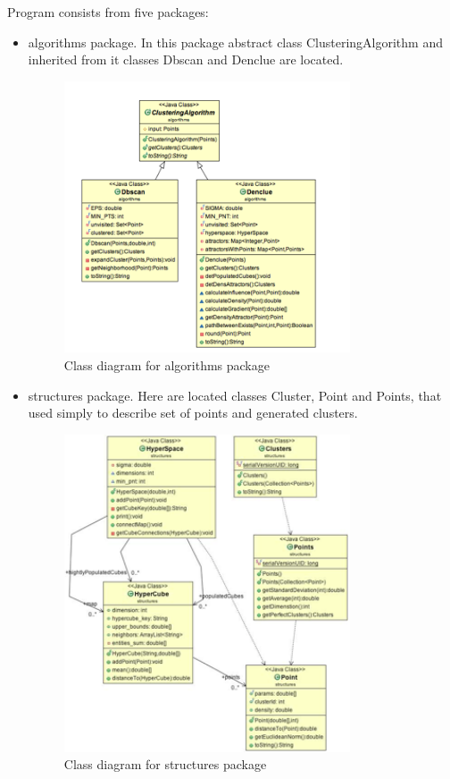 \documentclass[12pt, a4paper, notitlepage, oneside]{article}
\begin{document}
Program consists from five packages:
\begin{itemize}
	\item algorithms package. In this package abstract class ClusteringAlgorithm and inherited from it classes Dbscan and Denclue are located. 

	\begin{figure}[!ht]
 	\centering
	\includegraphics[width=0.8\textwidth]{images/algorithms_package.png}
 	\caption[]
	{Class diagram for algorithms package}
	\end{figure}


	\item structures package. Here are located classes Cluster, Point and Points, that used simply to describe set of points and generated clusters. 

	\begin{figure}[!ht]
 	\centering
	\includegraphics[width=0.8\textwidth]{images/structures_package.png}
 	\caption[]
	{Class diagram for structures package}
	\end{figure}


\end{itemize}
\end{document}
